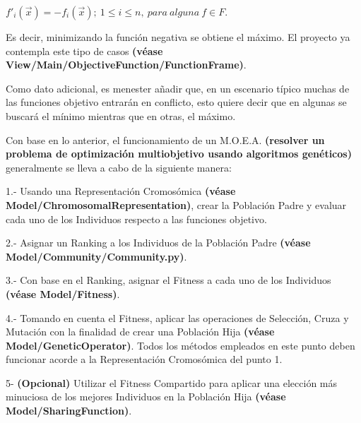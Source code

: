 \documentclass[letterpaper,10pt,english]{sphinxmanual}
\begin{document}
\begin{center}\(f'_i(\vec{x}) = -f_i(\vec{x});\ 1 \leqslant i \leqslant n,\ para\ alguna\ f \in F.\)
\end{center}
\begin{DUlineblock}{0em}
\item[] Es decir, minimizando la función negativa se obtiene el máximo. El proyecto ya contempla este tipo
de casos \textbf{(véase View/Main/ObjectiveFunction/FunctionFrame)}.
\item[] Como dato adicional, es menester añadir que, en un escenario típico muchas de las funciones
objetivo entrarán en conflicto, esto quiere decir que en algunas se buscará el mínimo mientras
que en otras, el máximo.
\item[] 
\item[] Con base en lo anterior, el funcionamiento de un M.O.E.A. \textbf{(resolver un problema de optimización
multiobjetivo usando algoritmos genéticos)} generalmente se lleva a cabo de la siguiente manera:
\item[] 
\item[] 1.- Usando una Representación Cromosómica \textbf{(véase Model/ChromosomalRepresentation)}, crear la Población Padre y evaluar cada uno de los Individuos respecto a las funciones objetivo.
\end{DUlineblock}

\begin{DUlineblock}{0em}
\item[] 2.- Asignar un Ranking a los Individuos de la Población Padre \textbf{(véase Model/Community/Community.py)}.
\end{DUlineblock}

\begin{DUlineblock}{0em}
\item[] 3.- Con base en el Ranking, asignar el Fitness a cada uno de los Individuos \textbf{(véase Model/Fitness)}.
\end{DUlineblock}

\begin{DUlineblock}{0em}
\item[] 4.- Tomando en cuenta el Fitness, aplicar las operaciones de Selección, Cruza y Mutación con la finalidad de crear una Población Hija \textbf{(véase Model/GeneticOperator)}. Todos los métodos empleados en este punto deben funcionar acorde a la Representación Cromosómica del punto 1.
\end{DUlineblock}

\begin{DUlineblock}{0em}
\item[] 5- \textbf{(Opcional)} Utilizar el Fitness Compartido para aplicar una elección más minuciosa de los mejores Individuos en la Población Hija \textbf{(véase Model/SharingFunction)}.
\end{DUlineblock}
\end{document}

